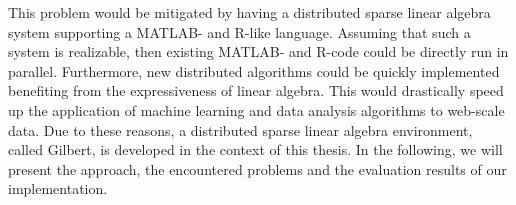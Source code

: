 This problem would be mitigated by having a distributed sparse linear algebra system supporting a MATLAB- and R-like language.
Assuming that such a system is realizable, then existing MATLAB- and R-code could be directly run in parallel.
Furthermore, new distributed algorithms could be quickly implemented benefiting from the expressiveness of linear algebra.
This would drastically speed up the application of machine learning and data analysis algorithms to web-scale data.
Due to these reasons, a distributed sparse linear algebra environment, called Gilbert, is developed in the context of this thesis.
In the following, we will present the approach, the encountered problems and the evaluation results of our implementation.